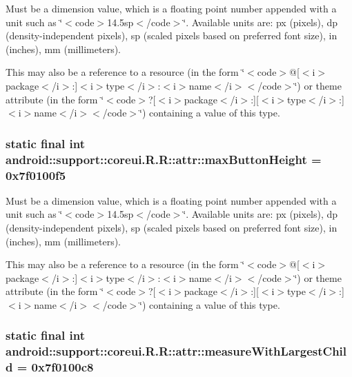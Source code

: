 Must be a dimension value, which is a floating point number appended with a unit such as \char`\"{}$<$code$>$14.5sp$<$/code$>$\char`\"{}. Available units are: px (pixels), dp (density-independent pixels), sp (scaled pixels based on preferred font size), in (inches), mm (millimeters). 

This may also be a reference to a resource (in the form \char`\"{}$<$code$>$@\mbox{[}$<$i$>$package$<$/i$>$:\mbox{]}$<$i$>$type$<$/i$>$:$<$i$>$name$<$/i$>$$<$/code$>$\char`\"{}) or theme attribute (in the form \char`\"{}$<$code$>$?\mbox{[}$<$i$>$package$<$/i$>$:\mbox{]}\mbox{[}$<$i$>$type$<$/i$>$:\mbox{]}$<$i$>$name$<$/i$>$$<$/code$>$\char`\"{}) containing a value of this type. \hypertarget{classandroid_1_1support_1_1coreui_1_1_r_1_1attr_a65ea07b8564b66e6253a5194baae09f}{
\subsubsection[{maxButtonHeight}]{\setlength{\rightskip}{0pt plus 5cm}static final int android::support::coreui.R.R::attr::maxButtonHeight = 0x7f0100f5}}
\label{classandroid_1_1support_1_1coreui_1_1_r_1_1attr_a65ea07b8564b66e6253a5194baae09f}


Must be a dimension value, which is a floating point number appended with a unit such as \char`\"{}$<$code$>$14.5sp$<$/code$>$\char`\"{}. Available units are: px (pixels), dp (density-independent pixels), sp (scaled pixels based on preferred font size), in (inches), mm (millimeters). 

This may also be a reference to a resource (in the form \char`\"{}$<$code$>$@\mbox{[}$<$i$>$package$<$/i$>$:\mbox{]}$<$i$>$type$<$/i$>$:$<$i$>$name$<$/i$>$$<$/code$>$\char`\"{}) or theme attribute (in the form \char`\"{}$<$code$>$?\mbox{[}$<$i$>$package$<$/i$>$:\mbox{]}\mbox{[}$<$i$>$type$<$/i$>$:\mbox{]}$<$i$>$name$<$/i$>$$<$/code$>$\char`\"{}) containing a value of this type. \hypertarget{classandroid_1_1support_1_1coreui_1_1_r_1_1attr_74e2aaa1cdaa16b0173ff573ac4de9ae}{
\subsubsection[{measureWithLargestChild}]{\setlength{\rightskip}{0pt plus 5cm}static final int android::support::coreui.R.R::attr::measureWithLargestChild = 0x7f0100c8}}
\label{classandroid_1_1support_1_1coreui_1_1_r_1_1attr_74e2aaa1cdaa16b0173ff573ac4de9ae}


